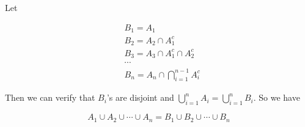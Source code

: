 \documentclass[a4paper, UTF-8]{article}
\theoremstyle{plain}
\begin{document}
Let

\begin{align*} 
  & B_1 = A_1 \\
  & B_2 = A_2 \cap A_1^c \\
  & B_3 = A_3 \cap A_1^c \cap A_2^c \\
  & \cdots \\
  & B_n = A_n \cap \bigcap_{i=1}^{n-1} A_i^c
\end{align*}

Then we can verify that $B_i$'s are disjoint and $\bigcup_{i=1}^n A_i = \bigcup_{i=1}^n B_i$. So we have

$$
A_1 \cup A_2 \cup \cdots \cup A_n = B_1 \cup B_2 \cup \cdots \cup B_n
$$
\end{document}
